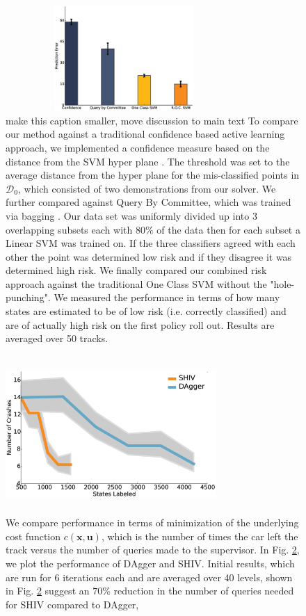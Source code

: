 \documentclass[10pt, conference]{ieeeconf}      %
\newcommand{\bu}{\mathbf{u}}
\newcommand{\bx}{\mathbf{x}}
\begin{document}
\begin{figure}[t]
\centering
\includegraphics[width=9cm, height=4cm]{figures/risk_bar.eps}
\caption { \footnotesize {\color{blue}make this caption smaller, move discussion to main text} To compare our method against a traditional confidence based active learning approach, we
       implemented a confidence measure based on the distance from the SVM hyper plane \cite{tong2002support}. The threshold was set to the average distance from the hyper plane for the mis-classified points in $\mathcal{D}_0$, which consisted of two demonstrations from our solver. We further compared against Query By Committee, which was trained via bagging \cite{}. Our data set was uniformly divided up into 3 overlapping subsets each with $80\%$ of the data then for each subset a Linear SVM was trained on. If the three classifiers agreed with each other the point was determined low risk and if they disagree it was determined high risk. We finally compared our combined risk approach against the traditional One Class SVM without the "hole-punching". We measured the performance in terms of how many states are estimated to be of low risk (i.e. correctly classified) and are of actually high risk on the first policy roll out. Results  are averaged over 50 tracks.
   }

\label{fig:active_comp}
\end{figure}



\begin{figure}[t!]
\centering
\includegraphics[width=8cm, height=6cm]{figures/dagger_shiv_one_class.eps}
\caption{We compare performance in terms of minimization of the underlying cost function $c(\bx,\bu)$, which is the  number of times the car left the track versus the number of queries made to the supervisor. In Fig. \ref{fig:car_cost}, we plot the performance of DAgger and SHIV.  Initial results, which are run for 6 iterations each and are averaged over 40 levels, shown in Fig. \ref{fig:car_cost} suggest an $70\%$ reduction in the number of queries needed for SHIV compared to DAgger,}
\vspace*{-10pt}
\label{fig:car_cost}
\end{figure}
\end{document}

